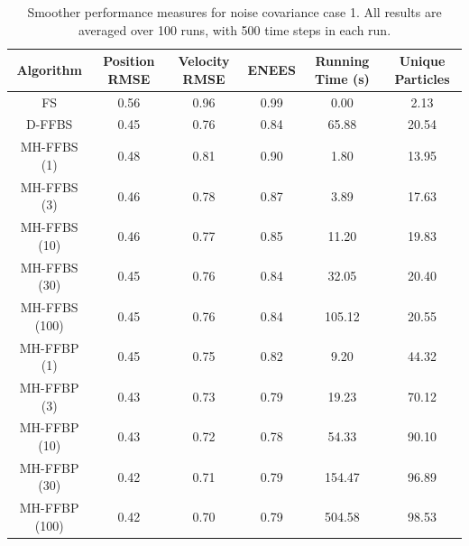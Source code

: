 \documentclass[peerreview,11pt,draftcls,onecolumn]{IEEEtran}
\begin{document}
\begin{table}[!t]%
\renewcommand{\arraystretch}{1.3}
\caption{Smoother performance measures for noise covariance case 1. All results are averaged over 100 runs, with 500 time steps in each run.}
\label{tab:case1_performance}
{\scriptsize
\begin{center}
\begin{tabular}{|c||c|c|c|c|c|}
\hline
Algorithm & \begin{minipage}[c]{0.9cm} Position RMSE \end{minipage} & \begin{minipage}[c]{0.9cm}  Velocity RMSE \end{minipage} & \begin{minipage}[c]{0.9cm}  ENEES \end{minipage} & \begin{minipage}[c]{0.9cm}  Running Time (s) \end{minipage} & \begin{minipage}[c]{0.9cm}  Unique Particles \end{minipage} \\
\hline
FS             & 0.56 & 0.96 & 0.99 & 0.00 & 2.13 \\
D-FFBS         & 0.45 & 0.76 & 0.84 & 65.88 & 20.54 \\
\hline
MH-FFBS (1)    & 0.48 & 0.81 & 0.90 & 1.80 & 13.95 \\
MH-FFBS (3)    & 0.46 & 0.78 & 0.87 & 3.89 & 17.63 \\
MH-FFBS (10)   & 0.46 & 0.77 & 0.85 & 11.20 & 19.83 \\
MH-FFBS (30)   & 0.45 & 0.76 & 0.84 & 32.05 & 20.40 \\
MH-FFBS (100)  & 0.45 & 0.76 & 0.84 & 105.12 & 20.55 \\
\hline
MH-FFBP (1)    & 0.45 & 0.75 & 0.82 & 9.20 & 44.32 \\
MH-FFBP (3)    & 0.43 & 0.73 & 0.79 & 19.23 & 70.12 \\
MH-FFBP (10)   & 0.43 & 0.72 & 0.78 & 54.33 & 90.10 \\
MH-FFBP (30)   & 0.42 & 0.71 & 0.79 & 154.47 & 96.89 \\
MH-FFBP (100)  & 0.42 & 0.70 & 0.79 & 504.58 & 98.53 \\
\hline
\end{tabular}
\end{center}
}
\end{table}
\end{document}
